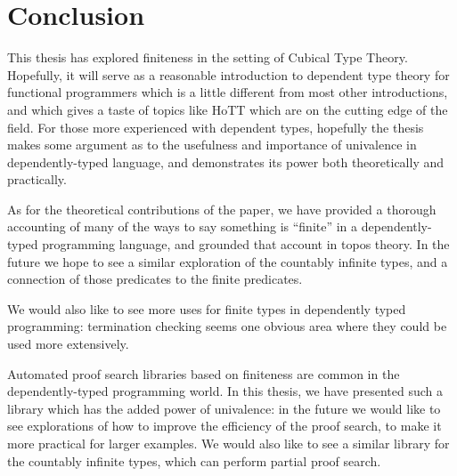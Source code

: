 \section{Conclusion}
This thesis has explored finiteness in the setting of Cubical Type Theory.
Hopefully, it will serve as a reasonable introduction to dependent type theory
for functional programmers which is a little different from most other
introductions, and which gives a taste of topics like HoTT which are on the
cutting edge of the field.
For those more experienced with dependent types, hopefully the thesis makes some
argument as to the usefulness and importance of univalence in dependently-typed
language, and demonstrates its power both theoretically and practically.

As for the theoretical contributions of the paper, we have provided a thorough
accounting of many of the ways to say something is ``finite'' in a
dependently-typed programming language, and grounded that account in topos
theory.
In the future we hope to see a similar exploration of the countably infinite
types, and a connection of those predicates to the finite predicates.

We would also like to see more uses for finite types in dependently typed
programming: termination checking seems one obvious area where they could be
used more extensively.

Automated proof search libraries based on finiteness are common in the
dependently-typed programming world.
In this thesis, we have presented such a library which has the added power of
univalence: in the future we would like to see explorations of how to improve
the efficiency of the proof search, to make it more practical for larger
examples.
We would also like to see a similar library for the countably infinite types,
which can perform partial proof search.

